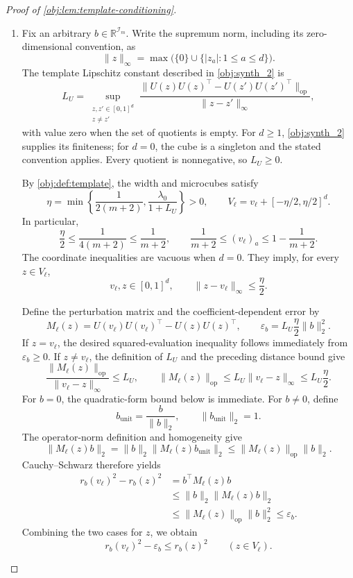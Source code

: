 \begin{proof}[Proof of \cref{obj:lem:template-conditioning}]
\begin{enumerate}
\item Fix an arbitrary \(b\in\mathbb R^{\mathcal I_m}\). Write the supremum norm, including its zero-dimensional convention, as
\[
\|z\|_\infty
=\max\bigl(\{0\}\cup\{|z_a|:1\le a\le d\}\bigr).
\]
The template Lipschitz constant described in \cref{obj:synth_2} is
\[
L_U=
\sup_{\substack{z,z'\in[0,1]^d\\z\ne z'}}
\frac{\|U(z)U(z)^\top-U(z')U(z')^\top\|_{\mathrm{op}}}
{\|z-z'\|_\infty},
\]
with value zero when the set of quotients is empty. For \(d\ge1\),
\cref{obj:synth_2} supplies its finiteness; for \(d=0\), the cube is a singleton and the stated convention applies. Every quotient is nonnegative, so \(L_U\ge0\).

By \cref{obj:def:template}, the width and microcubes satisfy
\[
\eta=\min\left\{\frac1{2(m+2)},\frac{\lambda_0}{1+L_U}\right\}>0,
\qquad
V_\ell=v_\ell+[-\eta/2,\eta/2]^d.
\]
In particular,
\[
\frac{\eta}{2}\le\frac1{4(m+2)}\le\frac1{m+2},
\qquad
\frac1{m+2}\le(v_\ell)_a
\le1-\frac1{m+2}.
\]
The coordinate inequalities are vacuous when \(d=0\). They imply, for every \(z\in V_\ell\),
\[
v_\ell,z\in[0,1]^d,
\qquad
\|z-v_\ell\|_\infty\le\frac{\eta}{2}.
\]

Define the perturbation matrix and the coefficient-dependent error by
\[
M_\ell(z)
=U(v_\ell)U(v_\ell)^\top-U(z)U(z)^\top,
\qquad
\varepsilon_b=L_U\frac{\eta}{2}\|b\|_2^2.
\]
If \(z=v_\ell\), the desired squared-evaluation inequality follows immediately from \(\varepsilon_b\ge0\). If \(z\ne v_\ell\), the definition of \(L_U\) and the preceding distance bound give
\[
\frac{\|M_\ell(z)\|_{\mathrm{op}}}{\|v_\ell-z\|_\infty}
\le L_U,
\qquad
\|M_\ell(z)\|_{\mathrm{op}}
\le L_U\|v_\ell-z\|_\infty
\le L_U\frac{\eta}{2}.
\]
For \(b=0\), the quadratic-form bound below is immediate. For \(b\ne0\), define
\[
b_{\mathrm{unit}}=\frac{b}{\|b\|_2},
\qquad
\|b_{\mathrm{unit}}\|_2=1.
\]
The operator-norm definition and homogeneity give
\[
\|M_\ell(z)b\|_2
=\|b\|_2\|M_\ell(z)b_{\mathrm{unit}}\|_2
\le\|M_\ell(z)\|_{\mathrm{op}}\|b\|_2.
\]
Cauchy--Schwarz therefore yields
\[
\begin{aligned}
r_b(v_\ell)^2-r_b(z)^2
&=b^\top M_\ell(z)b\\
&\le\|b\|_2\|M_\ell(z)b\|_2\\
&\le\|M_\ell(z)\|_{\mathrm{op}}\|b\|_2^2
\le\varepsilon_b.
\end{aligned}
\]
Combining the two cases for \(z\), we obtain
\[
r_b(v_\ell)^2-\varepsilon_b\le r_b(z)^2
\qquad(z\in V_\ell).
\]


\end{enumerate}
\end{proof}
